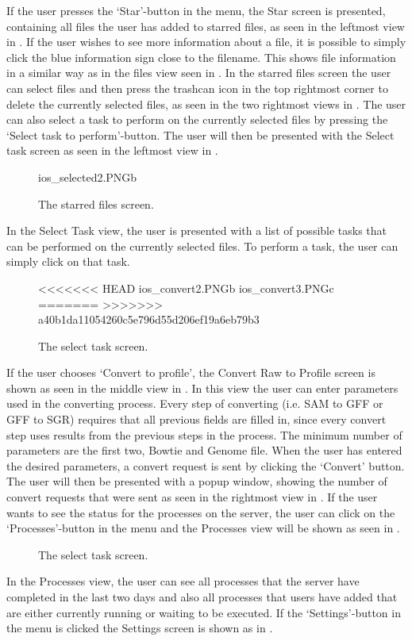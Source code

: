If the user presses the ‘Star’-button in the menu, the Star screen is presented, containing all files the user has added to starred files, as seen in the leftmost view in . If the user wishes to see more information about a file, it is possible to simply click the blue information sign close to the filename. This shows file information in a similar way as in the files view seen in . In the starred files screen the user can select files and then press the trashcan icon in the top rightmost corner to delete the currently selected files, as seen in the two rightmost views in . The user can also select a task to perform on the currently selected files by pressing the ‘Select task to perform’-button. The user will then be presented with the Select task screen as seen in the leftmost view in .

\begin{figure}[htb]
		{ios_selected2.PNG}{b}
\caption{The starred files screen.}
\label{fig:ios_selectedFiles}
\end{figure}
\FloatBarrier
In the Select Task view, the user is presented with a list of possible tasks that can be performed on the currently selected files. To perform a task, the user can simply click on that task.

\begin{figure}[htb]
<<<<<<< HEAD
		{ios_convert2.PNG}{b}
		{ios_convert3.PNG}{c}
=======
>>>>>>> a40b1da11054260c5e796d55d206ef19a6eb79b3
\caption{The select task screen.}
\label{fig:ios_convert}
\end{figure}
\FloatBarrier
If the user chooses ‘Convert to profile’, the Convert Raw to Profile screen is shown as seen in the middle view in . In this view the user can enter parameters used in the converting process. Every step of converting (i.e. SAM to GFF or GFF to SGR) requires that all previous fields are filled in, since every convert step uses results from the previous steps in the process. The minimum number of parameters are the first two, Bowtie and Genome file. When the user has entered the desired parameters, a convert request is sent by clicking the ‘Convert’ button. The user will then be presented with a popup window, showing the number of convert requests that were sent as seen in the rightmost view in . If the user wants to see the status for the processes on the server, the user can click on the ‘Processes’-button in the menu and the Processes view will be shown as seen in .
\begin{figure}[htb]
\caption{The select task screen.}
\label{fig:ios_processes}
\end{figure}
\FloatBarrier
In the Processes view, the user can see all processes that the server have completed in the last two days and also all processes that users have added that are either currently running or waiting to be executed.
If the ‘Settings’-button in the menu is clicked the Settings screen is shown as in .  

